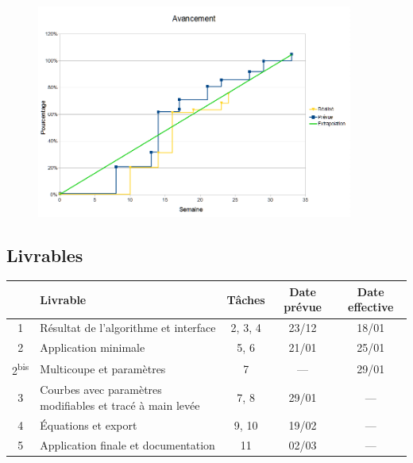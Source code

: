 \documentclass[xcolor=dvipsnames]{beamer}
\begin{document}
	\begin{frame}{\subsecname}
		\begin{figure}
			\includegraphics[height=7cm]{Images/Avancement2.png}
		\end{figure}
	\end{frame}


	\subsection{Livrables}
	\begin{frame}{\subsecname}
		\begin{center}
		\small
		\begin{tabular}{|c|>{\raggedright}m{3cm}|c|c|c|}
			\hline
			\textbf{\No} & \textbf{Livrable} & \textbf{T\^aches}
			& \textbf{Date pr\'evue} & \textbf{Date effective}\\
			\hline
			1 & R\'esultat de l'algorithme et interface & 2, 3, 4 & 23/12 
			& 18/01\\
			\hline
			2 & Application minimale & 5, 6 & 21/01 & 25/01\\
			\hline
			2\textsuperscript{bis} & Multicoupe et param\`etres & 7 & --- & 29/01\\
			\hline
			3 & Courbes avec param\`etres modifiables et trac\'e \`a main
			lev\'ee& 7, 8 & 29/01 & ---\\
			\hline
			4 & \'Equations et export & 9, 10 & 19/02 & ---\\
			\hline
			5 & Application finale et documentation & 11 & 02/03 & ---\\
			\hline
		\end{tabular}
		\end{center}
	\end{frame}
\end{document}
